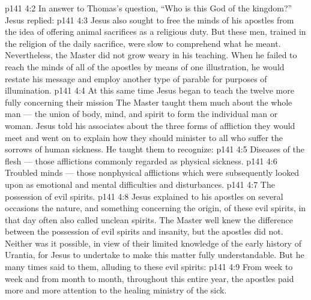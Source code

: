 \vs p141 4:2 In answer to Thomas’s question, “Who is this God of the kingdom?” Jesus replied: 
\vs p141 4:3 Jesus also sought to free the minds of his apostles from the idea of offering animal sacrifices as a religious duty. But these men, trained in the religion of the daily sacrifice, were slow to comprehend what he meant. Nevertheless, the Master did not grow weary in his teaching. When he failed to reach the minds of all of the apostles by means of one illustration, he would restate his message and employ another type of parable for purposes of illumination.
\vs p141 4:4 \pc At this same time Jesus began to teach the twelve more fully concerning their mission  The Master taught them much about the whole man --- the union of body, mind, and spirit to form the individual man or woman. Jesus told his associates about the three forms of affliction they would meet and went on to explain how they should minister to all who suffer the sorrows of human sickness. He taught them to recognize:
\vs p141 4:5 \bibnobreakspace Diseases of the flesh --- those afflictions commonly regarded as physical sickness.
\vs p141 4:6 \bibnobreakspace Troubled minds --- those nonphysical afflictions which were subsequently looked upon as emotional and mental difficulties and disturbances.
\vs p141 4:7 \bibnobreakspace The possession of evil spirits.
\vs p141 4:8 \pc Jesus explained to his apostles on several occasions the nature, and something concerning the origin, of these evil spirits, in that day often also called unclean spirits. The Master well knew the difference between the possession of evil spirits and insanity, but the apostles did not. Neither was it possible, in view of their limited knowledge of the early history of Urantia, for Jesus to undertake to make this matter fully understandable. But he many times said to them, alluding to these evil spirits: 
\vs p141 4:9 From week to week and from month to month, throughout this entire year, the apostles paid more and more attention to the healing ministry of the sick.
